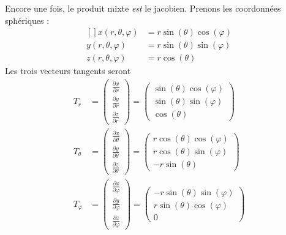 Encore une fois, le produit mixte \emph{est} le jacobien. Prenons les coordonnées sphériques :
\begin{equation}
	\begin{aligned}[]
		x(r,\theta,\varphi) & =r\sin(\theta)\cos(\varphi) \\
		y(r,\theta,\varphi) & =r\sin(\theta)\sin(\varphi) \\
		z(r,\theta,\varphi) & =r\cos(\theta)
	\end{aligned}
\end{equation}
Les trois vecteurs tangents seront
\begin{subequations}
	\begin{align}
		T_r         & =\begin{pmatrix}
			               \frac{ \partial x }{ \partial r } \\
			               \frac{ \partial y }{ \partial r } \\
			               \frac{ \partial z }{ \partial r }
		               \end{pmatrix}=\begin{pmatrix}
			                             \sin(\theta)\cos(\varphi) \\
			                             \sin(\theta)\sin(\varphi) \\
			                             \cos(\theta)
		                             \end{pmatrix}   \\
		T_{\theta}  & =\begin{pmatrix}
			               \frac{ \partial x }{ \partial \theta } \\
			               \frac{ \partial y }{ \partial \theta } \\
			               \frac{ \partial z }{ \partial \theta }
		               \end{pmatrix}=\begin{pmatrix}
			                             r\cos(\theta)\cos(\varphi) \\
			                             r\cos(\theta)\sin(\varphi) \\
			                             -r\sin(\theta)
		                             \end{pmatrix}  \\
		T_{\varphi} & =\begin{pmatrix}
			               \frac{ \partial x }{ \partial \varphi } \\
			               \frac{ \partial y }{ \partial \varphi } \\
			               \frac{ \partial z }{ \partial \varphi }
		               \end{pmatrix}=\begin{pmatrix}
			                             -r\sin(\theta)\sin(\varphi) \\
			                             r\sin(\theta)\cos(\varphi)  \\
			                             0
		                             \end{pmatrix}
	\end{align}
\end{subequations}
